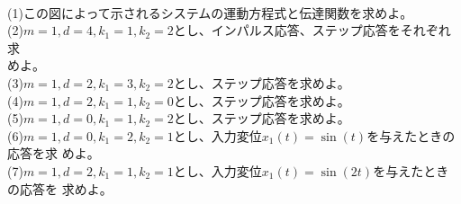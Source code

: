 \documentclass[a4paper,12pt]{article}
\begin{document}
\begin{minipage}[t]{0.35\linewidth}
\begin{center}
    \end{center}
\end{minipage}\\

\indent
(1)この図によって示されるシステムの運動方程式と伝達関数を求めよ。\\

\indent
(2)\(m=1,d=4,k_1=1,k_2=2\)とし、インパルス応答、ステップ応答をそれぞれ求\\
\indent \quad めよ。\\

\indent
(3)\(m=1,d=2,k_1=3,k_2=2\)とし、ステップ応答を求めよ。\\

\indent
(4)\(m=1,d=2,k_1=1,k_2=0\)とし、ステップ応答を求めよ。\\

\indent
(5)\(m=1,d=0,k_1=1,k_2=2\)とし、ステップ応答を求めよ。\\

\indent
(6)\(m=1,d=0,k_1=2,k_2=1\)とし、入力変位\(x_1(t)=\sin(t)\)を与えたときの応答を求
\indent \quad めよ。\\

\indent
(7)\(m=1,d=2,k_1=1,k_2=1\)とし、入力変位\(x_1(t)=\sin(2t)\)を与えたときの応答を
\indent \quad 求めよ。\\

\newpage
\end{document}
